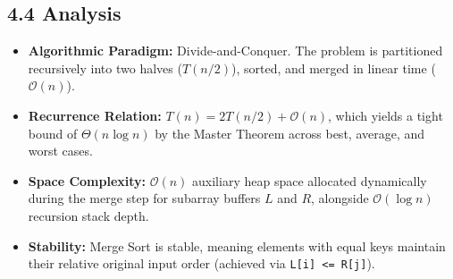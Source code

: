\documentclass[12pt]{article}
\begin{document}
\subsection*{4.4 Analysis}
\begin{itemize}
    \item \textbf{Algorithmic Paradigm:} Divide-and-Conquer. The problem is partitioned recursively into two halves ($T(n/2)$), sorted, and merged in linear time ($\mathcal{O}(n)$).
    \item \textbf{Recurrence Relation:} $T(n) = 2T(n/2) + \mathcal{O}(n)$, which yields a tight bound of $\Theta(n \log n)$ by the Master Theorem across best, average, and worst cases.
    \item \textbf{Space Complexity:} $\mathcal{O}(n)$ auxiliary heap space allocated dynamically during the merge step for subarray buffers $L$ and $R$, alongside $\mathcal{O}(\log n)$ recursion stack depth.
    \item \textbf{Stability:} Merge Sort is stable, meaning elements with equal keys maintain their relative original input order (achieved via \texttt{L[i] <= R[j]}).
\end{itemize}
\end{document}
